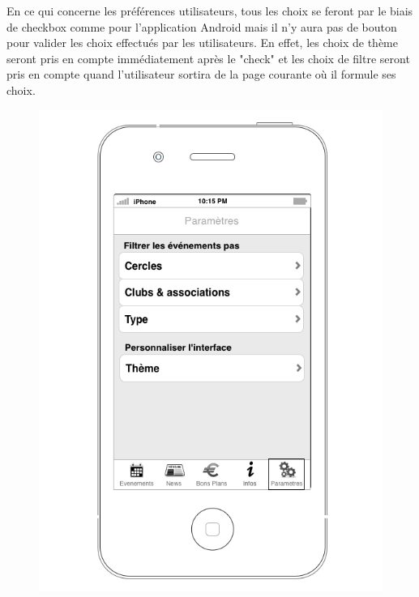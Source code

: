 \documentclass[a4paper, 11px]{article}
\begin{document}
En ce qui concerne les préférences utilisateurs, tous les choix se feront par le biais de checkbox comme pour l'application Android mais il n'y aura pas de bouton pour valider les choix effectués par les utilisateurs. 
En effet, les choix de thème seront pris en compte immédiatement après le "check" et les choix de filtre seront pris en compte quand l'utilisateur sortira de la page courante où il formule ses choix.
\begin{figure}[htbp]
	\begin{minipage}[c]{.50\linewidth}
		\begin{center}
			\includegraphics[scale=0.3]{../../Sketch/iOS/parametres.png}
		\end{center}
	\end{minipage}
	\hfill
	\begin{minipage}[c]{.50\linewidth}
		\begin{center}

\end{center}
\end{minipage}
\end{figure}
\end{document}
